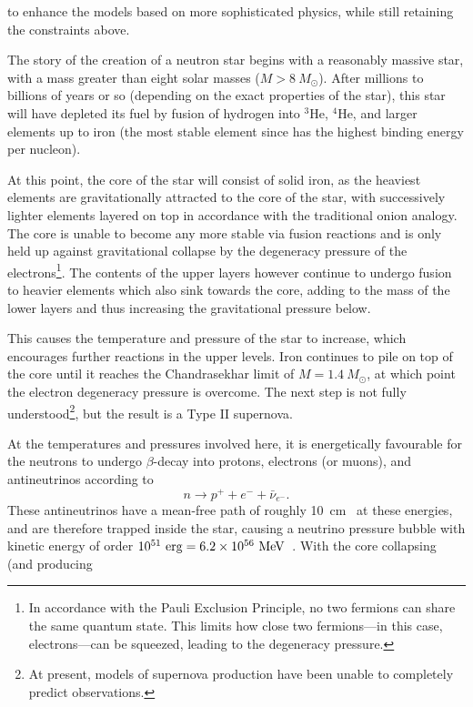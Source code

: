 \documentclass[11pt,a4paper,twoside]{carrollthesis}
\newcommand{\be}{\begin{equation}}
\newcommand{\ee}{\end{equation}}
\newcommand{\emdash}{\hspace{1pt}---\hspace{1pt}}
\begin{document}
to enhance the models based on more sophisticated physics, while still
retaining the constraints above.\par
%
The story of the creation of a neutron star begins with a reasonably
massive star, with a mass greater than eight solar masses
($M>8~M_\odot$). After millions to billions of years or so (depending
on the exact properties of the star), this star will have depleted its
fuel by fusion of hydrogen into
${}^3$He, ${}^4$He, and larger elements up to iron (the most stable
element since has the highest binding energy per nucleon).\par
%
At this point, the core of the star will consist of solid iron, as the
heaviest elements are gravitationally attracted to the core of the
star, with successively lighter elements layered on top in accordance
with the traditional onion analogy. The core is unable to become any
more stable via fusion reactions and is only held up against
gravitational collapse by the degeneracy pressure of the
electrons\footnote{In accordance with the Pauli Exclusion Principle,
  no two fermions can share the same quantum state. This limits how
  close two fermions\emdash in this case, electrons\emdash can be
  squeezed, leading to the degeneracy pressure.}. The contents of the
upper layers however continue to undergo fusion to heavier elements
which also sink towards the core, adding to the mass of the lower
layers and thus increasing the gravitational pressure below.\par
%
This causes the temperature and pressure of the star to increase,
which encourages further reactions in the upper levels. Iron continues
to pile on top of the core until it reaches the Chandrasekhar limit of
$M = 1.4~M_\odot$, at which point the electron degeneracy pressure is
overcome. The next step is not fully understood\footnote{At present,
  models of supernova production have been unable to completely
  predict observations.}, but the result is a Type II supernova.\par
%
At the temperatures and pressures involved here, it is energetically
favourable for the neutrons to undergo $\beta$-decay into
protons, electrons (or muons), and antineutrinos according to
%
\be \label{eq:inversebeta}
n \to p^+ + e^- + \bar{\nu}_{e^-}.
\ee
%
These antineutrinos have a mean-free path of roughly
10~cm~\cite{Lattimer:2004} at these energies, and are therefore
trapped inside the star, causing a neutrino pressure bubble with
kinetic energy of order $10^{51}~{\rm erg} = 6.2\times 10^{56}~{\rm
  MeV}$~\cite{Lattimer:2004}. With the core collapsing (and producing
\end{document}
